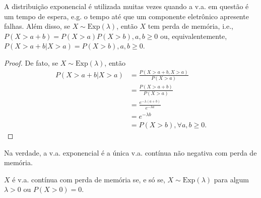 \documentclass[../Notas.tex]{subfiles}
\begin{document}
\begin{remark}
A distribuição exponencial é utilizada muitas vezes quando a v.a. em questão é um tempo de espera, e.g. o tempo até que um componente eletrônico apresente falhas. Além disso, se $X\sim\text{Exp}(\lambda)$, então $X$ tem perda de memória, i.e., $P(X > a+b) = P(X>a)P(X>b), a,b\geq 0$ ou, equivalentemente, $P(X>a+b| X>a) = P(X>b), a,b\geq 0$.
\begin{proof}
De fato, se $X\sim\text{Exp}(\lambda)$, então
\begin{align*}
    P(X>a+b|X>a) &= \frac{P(X>a+b, X>a)}{P(X>a)} \\
    &= \frac{P(X>a+b)}{P(X>a)} \\
    &= \frac{ e^{-\lambda (a+b)} }{ e^{-\lambda a} } \\
    &= e^{-\lambda b} \\
    &= P(X>b), \forall a,b\geq 0.
\end{align*}
\end{proof}
Na verdade, a v.a. exponencial é a única v.a. contínua não negativa com perda de memória.
\end{remark}

\begin{theorem}
$X$ é v.a. contínua com perda de memória se, e só se, $X\sim\text{Exp}(\lambda)$ para algum $\lambda > 0$ ou $P(X>0) = 0$.
\end{theorem}
\end{document}
